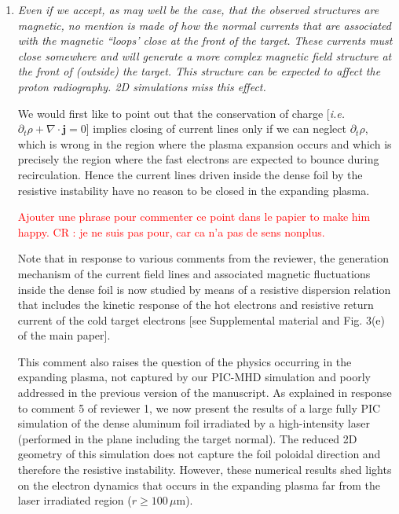 \documentclass{article}
\begin{document}
\begin{enumerate}
\item \textit{Even if we accept, as may well be the case, that the observed structures are magnetic, no mention is made of how the normal currents that are associated with the magnetic ``loops' close at the front of the target. These currents must close somewhere and will generate a more complex magnetic field structure at the front of (outside) the target. This structure can be expected to affect the proton radiography. 2D simulations miss this effect.}

We would first like to point out that the conservation of charge [\emph{i.e.} $\partial_t \rho+\nabla \cdot \mathbf{j}=0$] implies closing of current lines only if we can neglect $\partial_t \rho$, which is  wrong in the region  where the plasma expansion occurs and which is precisely  the region where the fast electrons are expected to bounce during recirculation.
Hence  the current lines  driven inside the dense foil by the resistive instability have no reason to be closed in the expanding plasma.

\textcolor{red}{
Ajouter une phrase pour commenter ce point dans le papier to make him happy.
CR :  je ne suis pas pour, car ca n'a pas de sens nonplus.
}

Note that in response to various comments from the reviewer,  the generation mechanism of the current field lines and associated magnetic fluctuations inside the dense foil is now studied by means of a resistive dispersion relation that includes the kinetic response of the hot electrons and resistive return current of the cold target electrons [see Supplemental material and Fig. 3(e) of the main paper]. 

This comment also raises the question of the physics occurring in the expanding plasma,  not captured by our PIC-MHD simulation and poorly addressed in the previous version of the manuscript.
As explained in response to comment 5 of reviewer 1, 
we now present the results of a large fully PIC simulation of the dense aluminum foil irradiated by a high-intensity laser (performed in the plane including the target normal). 
The reduced 2D geometry of this simulation does not  capture the foil poloidal direction and therefore the resistive instability. 
However, these numerical results shed lights on the electron dynamics that occurs in the expanding plasma far from the laser irradiated region ($r \ge 100 \, \mu$m).


\end{enumerate}
\end{document}
